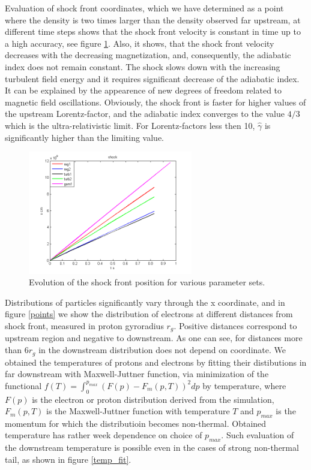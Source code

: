 \documentclass[a4paper]{jpconf}
\begin{document}
	Evaluation of shock front coordinates, which we have determined as a point where  the density is two times larger than the density observed far upstream, at different time steps shows that the shock front velocity is constant in time up to a high accuracy, see figure \ref{shock_x}. Also, it shows, that the shock front velocity decreases with the decreasing magnetization, and, consequently, the adiabatic index does not remain constant. The shock slows down with the increasing turbulent field energy and it requires significant decrease of the adiabatic index. It can be explained by the appearence of new degrees of freedom related to magnetic field oscillations. Obviously, the shock front is faster for higher values of the upstream Lorentz-factor, and the adiabatic index  converges to the value $4/3$ which is the ultra-relativistic limit. For Lorentz-factors less then 10, $\hat{\gamma}$ is significantly higher than the limiting value. 
	
	
	\begin{figure}[h!]
		\centering
		\includegraphics[width=0.64\textwidth]{fig/shock_x.png} 
		\caption{Evolution of the shock front position for various parameter sets.}
		\label{shock_x}
	\end{figure}
	
	Distributions of particles significantly vary through the x coordinate, and in figure \ref{points} we show the distribution of electrons at different distances from shock front, measured in proton gyroradius $r_g$. Positive distances correspond to upstream region and negative to downstream. As one can see, for distances more than $6 r_g$ in the downstream distribution does not depend on coordinate.  We obtained the temperatures of protons and electrons by fitting their distibutions in far downstream with Maxwell-Juttner function, via minimization of the functional $f(T) = \int_{0}^{p_{max}} (F(p) - F_{m}(p,T))^2dp$ by temperature, where $F(p)$ is the electron or proton distribution derived from the simulation, $F_{m}(p,T)$ is the Maxwell-Juttner function with temperature $T$ and $p_{max}$ is the momentum for which the distributioin becomes non-thermal. Obtained temperature has rather week dependence on choice of $p_{max}$. Such evaluation of the downstream temperature is possible even in the cases of strong non-thermal tail, as shown in figure \ref{temp_fit}.
	
\end{document}
